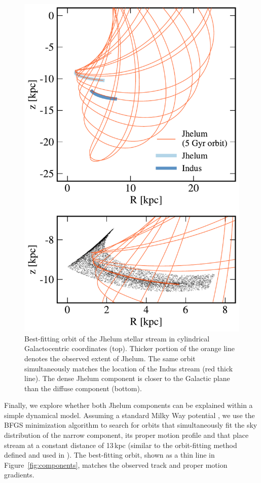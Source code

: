 \documentclass[twocolumn]{aastex62}
\begin{document}
\begin{figure}
\begin{center}
\includegraphics[width=\columnwidth]{orbit_cyl.pdf}
\end{center}
\caption{
Best-fitting orbit of the Jhelum stellar stream in cylindrical Galactocentric coordinates (top).
Thicker portion of the orange line denotes the observed extent of Jhelum.
The same orbit simultaneously matches the location of the Indus stream (red thick line).
The dense Jhelum component is closer to the Galactic plane than the diffuse component (bottom).
}
\label{fig:galactocentric}
\end{figure}

Finally, we explore whether both Jhelum components can be explained within a simple dynamical model.
Assuming a standard Milky Way potential \citep{gala}, we use the BFGS minimization algorithm to search for orbits that simultaneously fit the sky distribution of the narrow component, its proper motion profile and that place stream at a constant distance of 13\,kpc (similar to the orbit-fitting method defined and used in \citealt{pwb}).
The best-fitting orbit, shown as a thin line in Figure~\ref{fig:components}, matches the observed track and proper motion gradients.
\end{document}
